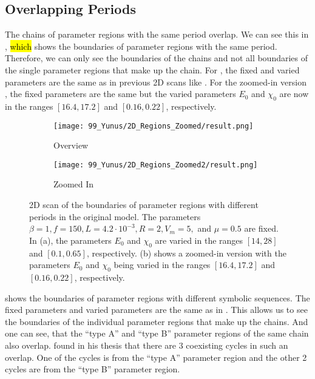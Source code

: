 \subsection{Overlapping Periods}

The chains of parameter regions with the same period overlap.
We can see this in , \hl{which} shows the boundaries of parameter regions with the same period.
Therefore, we can only see the boundaries of the chains and not all boundaries of the single parameter regions that make up the chain.
For , the fixed and varied parameters are the same as in previous 2D scans like .
For the zoomed-in version , the fixed parameters are the same but the varied parameters $E_0$ and $\chi_0$ are now in the ranges $[16.4, 17.2]$ and $[0.16, 0.22]$, respectively.

\begin{figure}
	\centering
	\begin{subfigure}{0.4\textwidth}
		\texttt{[image: 99\_Yunus/2D\_Regions\_Zoomed/result.png]}
		\caption{Overview}
		\label{fig:state.og.overlapping.chains.full}
	\end{subfigure}
	\begin{subfigure}{0.4\textwidth}
		\texttt{[image: 99\_Yunus/2D\_Regions\_Zoomed2/result.png]}
		\caption{Zoomed In}
		\label{fig:state.og.overlapping.chains.zoomed}
	\end{subfigure}
	\caption[2D scan of the boundaries of parameter regions with different periods in the original model]{
		2D scan of the boundaries of parameter regions with different periods in the original model.
		The parameters $\beta = 1, f = 150, L = 4.2 \cdot 10^{-3}, R = 2, V_m = 5,$ and $\mu = 0.5$ are fixed.
		In (a), the parameters $E_0$ and $\chi_0$ are varied in the ranges $[14, 28]$ and $[0.1, 0.65]$, respectively.
		(b) shows a zoomed-in version with the parameters $E_0$ and $\chi_0$ being varied in the ranges $[16.4, 17.2]$ and $[0.16, 0.22]$, respectively.
	}
	\label{fig:state.og.overlapping.chains}
\end{figure}

 shows the boundaries of parameter regions with different symbolic sequences.
The fixed parameters and varied parameters are the same as in .
This allows us to see the boundaries of the individual parameter regions that make up the chains.
And one can see, that the ``type A'' and ``type B'' parameter regions of the same chain also overlap.
 found in his thesis that there are 3 coexisting cycles in such an overlap.
One of the cycles is from the ``type A'' parameter region and the other 2 cycles are from the ``type B'' parameter region.

